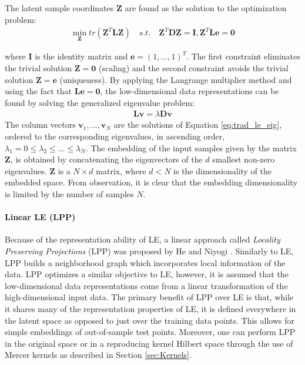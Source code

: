 The latent sample coordinates $\bm{Z}$ are found as the solution to the optimization problem:
\begin{align}
	\min_{\bm{Z}} tr(\bm{Z}^{T}\bm{L}\bm{Z}) \quad s.t. \quad \bm{Z}^{T}\bm{D}\bm{Z} = \bm{I}, \bm{Z}^{T}\bm{L}\bm{e} = \bm{0}
\end{align}

\noindent
where $\bm{I}$ is the identity matrix and $\bm{e} = (1, \dots, 1)^{T}$.  The first constraint eliminates the trivial solution $\bm{Z} = \bm{0}$ (scaling) and the second constraint avoids the trivial solution $\bm{Z} = \bm{e}$ (uniqueness). By applying the Langrange multiplier method and using the fact that $\bm{L}\bm{e} = \bm{0}$, the low-dimensional data representations can be found by solving the generalized eigenvalue problem:
\begin{align}
	\bm{L}\bm{v} = \lambda \bm{D} \bm{v} \label{eq:trad_le_eig}
\end{align}
\noindent
The column vectors $\bm{v}_{1}, \dots, \bm{v}_{N}$ are the solutions of Equation \ref{eq:trad_le_eig}, ordered to the corresponding eigenvalues, in ascending order, $\lambda_{1} = 0 \leq \lambda_{2} \leq \dots \leq \lambda_{N} $. The embedding of the input samples given by the matrix $\bm{Z}$, is obtained by concatenating the eigenvectors of the $d$ smallest non-zero eigenvalues.  $\bm{Z}$ is a $N \times d$ matrix, where $d < N$ is the dimensionality of the embedded space.  From observation, it is clear that the embedding dimensionality is limited by the number of samples $N$.

\paragraph{Linear LE (LPP)}
Because of the representation ability of LE, a linear approach called \textit{Locality Preserving Projections} (LPP) was proposed by He and Niyogi \citep{He2003LPP}.  Similarly to LE, LPP builds a neighborhood graph which incorporates local information of the data.  LPP optimizes a similar objective to LE, however, it is assumed that the low-dimensional data representations come from a linear transformation of the high-dimensional input data.  The primary benefit of LPP over LE is that, while it shares many of the representation properties of LE, it is defined everywhere in the latent space as opposed to just over the training data points.  This allows for simple embeddings of out-of-sample test points.  Moreover, one can perform LPP in the original space or in a reproducing kernel Hilbert space through the use of Mercer kernels as described in Section \ref{sec:Kernels}.

